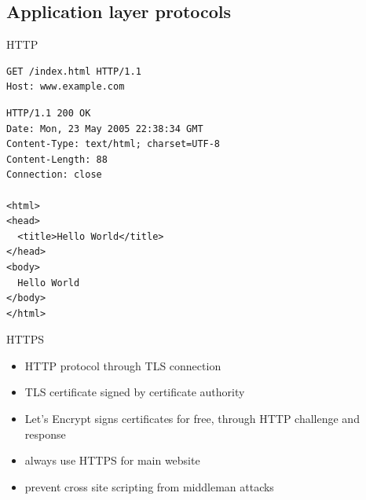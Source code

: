 \documentclass{beamer}
\begin{document}
\subsection{Application layer protocols}

\begin{frame}[fragile]{HTTP}
  \scriptsize
  \begin{lstlisting}
GET /index.html HTTP/1.1
Host: www.example.com
  \end{lstlisting}
  \begin{lstlisting}
HTTP/1.1 200 OK
Date: Mon, 23 May 2005 22:38:34 GMT
Content-Type: text/html; charset=UTF-8
Content-Length: 88
Connection: close

<html>
<head>
  <title>Hello World</title>
</head>
<body>
  Hello World
</body>
</html>
  \end{lstlisting}
\end{frame}

\begin{frame}{HTTPS}
  \begin{itemize}
    \item HTTP protocol through TLS connection
    \item TLS certificate signed by certificate authority
    \item Let's Encrypt signs certificates for free, through HTTP challenge and
      response
    \item always use HTTPS for main website
    \item prevent cross site scripting from middleman attacks
  \end{itemize}
\end{frame}
\end{document}

